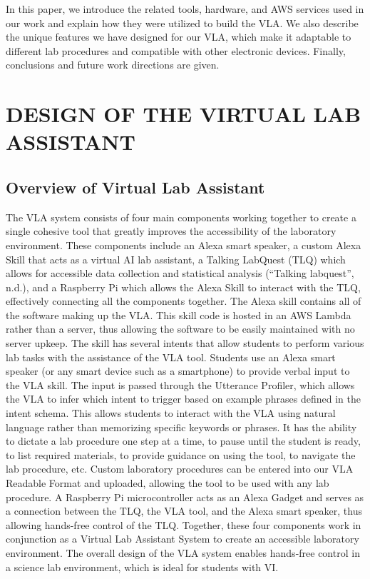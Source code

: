 \documentclass[11.5pt]{sig-alternate} %
\begin{document}
\begin{large}
In this paper, we introduce the related tools, hardware, and AWS services used in our work and explain how they were utilized to build the VLA. We also describe the unique features we have designed for our VLA, which make it adaptable to different lab procedures and compatible with other electronic devices. Finally, conclusions and future work directions are given. 

\section*{DESIGN OF THE VIRTUAL LAB ASSISTANT}

\subsection*{Overview of Virtual Lab Assistant}

The VLA system consists of four main components working together to create a single cohesive tool that greatly improves the accessibility of the laboratory environment. These components include an Alexa smart speaker, a custom Alexa Skill that acts as a virtual AI lab assistant, a Talking LabQuest (TLQ) which allows for accessible data collection and statistical analysis (“Talking labquest”, n.d.), and a Raspberry Pi which allows the Alexa Skill to interact with the TLQ, effectively connecting all the components together. The Alexa skill contains all of the software making up the VLA. This skill code is hosted in an AWS Lambda rather than a server, thus allowing the software to be easily maintained with no server upkeep. The skill has several intents that allow students to perform various lab tasks with the assistance of the VLA tool. Students use an Alexa smart speaker (or any smart device such as a smartphone) to provide verbal input to the VLA skill. The input is passed through the Utterance Profiler, which allows the VLA to infer which intent to trigger based on example phrases defined in the intent schema. This allows students to interact with the VLA using natural language rather than memorizing specific keywords or phrases. It has the ability to dictate a lab procedure one step at a time, to pause until the student is ready, to list required materials, to provide guidance on using the tool, to navigate the lab procedure, etc. Custom laboratory procedures can be entered into our VLA Readable Format and uploaded, allowing the tool to be used with any lab procedure. A Raspberry Pi microcontroller acts as an Alexa Gadget and serves as a connection between the TLQ, the VLA tool, and the Alexa smart speaker, thus allowing hands-free control of the TLQ. Together, these four components work in conjunction as a Virtual Lab Assistant System to create an accessible laboratory environment. The overall design of the VLA system enables hands-free control in a science lab environment, which is ideal for students with VI.


\end{large}
\end{document}
